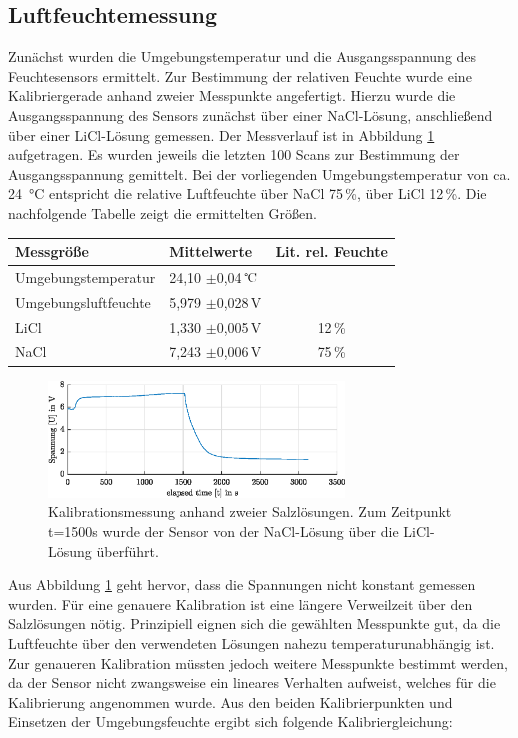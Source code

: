 \subsection{Luftfeuchtemessung}
Zunächst wurden die Umgebungstemperatur und die Ausgangsspannung des Feuchtesensors ermittelt. Zur Bestimmung der relativen Feuchte wurde eine Kalibriergerade anhand zweier Messpunkte angefertigt. Hierzu wurde die Ausgangsspannung des Sensors zunächst über einer NaCl-Lösung, anschließend über einer LiCl-Lösung gemessen. Der Messverlauf ist in Abbildung \ref{fig:cal} aufgetragen. Es wurden jeweils die letzten 100 Scans zur Bestimmung der Ausgangsspannung gemittelt. Bei der vorliegenden Umgebungstemperatur von ca. \SI{24}{\celsius} entspricht die relative Luftfeuchte über NaCl 75\,\%, über LiCl 12\,\%. Die nachfolgende Tabelle zeigt die ermittelten Größen.
\begin{center}
	\begin{tabular}{l|l|c}
		\label{tab:amb}
		
		\textbf{Messgröße} & \textbf{Mittelwerte} & \textbf{Lit. rel. Feuchte}\\
		\hline
		Umgebungstemperatur & 24,10 $\pm$0,04\,$\celsius$ &\\
		Umgebungsluftfeuchte & 5,979 $\pm$0,028\,V & \\
		LiCl & 1,330 $\pm$0,005\,V & 12\,\%\\
		NaCl & 7,243 $\pm$0,006\,V & 75\,\%
	\end{tabular}
\end{center}



\begin{figure}[H]
	\centering
	\includegraphics[width=0.7\textwidth]{../DATA/Messreihe_Feuchtekalibration.eps}
	\caption[Kalibrationsmessung]{Kalibrationsmessung anhand zweier Salzlösungen. Zum Zeitpunkt t=1500s wurde der Sensor von der NaCl-Lösung über die LiCl-Lösung überführt.}
	\label{fig:cal}
\end{figure}

Aus Abbildung \ref{fig:cal} geht hervor, dass die Spannungen nicht konstant gemessen wurden. Für eine genauere Kalibration ist eine längere Verweilzeit über den Salzlösungen nötig. Prinzipiell eignen sich die gewählten Messpunkte gut, da die Luftfeuchte über den verwendeten Lösungen nahezu temperaturunabhängig ist. Zur genaueren Kalibration müssten jedoch weitere Messpunkte bestimmt werden, da der Sensor nicht zwangsweise ein lineares Verhalten aufweist, welches für die Kalibrierung angenommen wurde. Aus den beiden Kalibrierpunkten und Einsetzen der Umgebungsfeuchte ergibt sich folgende Kalibriergleichung:



